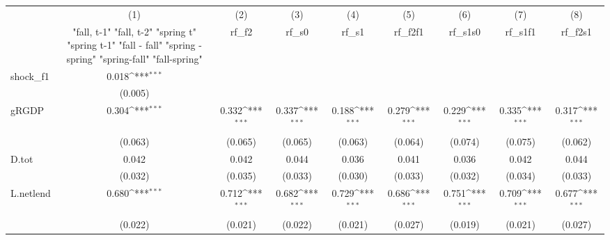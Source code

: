 {
\def\sym#1{\ifmmode^{#1}\else\(^{#1}\)\fi}
\begin{tabular}{l*{8}{c}}
\toprule
            &\multicolumn{1}{c}{(1)}&\multicolumn{1}{c}{(2)}&\multicolumn{1}{c}{(3)}&\multicolumn{1}{c}{(4)}&\multicolumn{1}{c}{(5)}&\multicolumn{1}{c}{(6)}&\multicolumn{1}{c}{(7)}&\multicolumn{1}{c}{(8)}\\
            &\multicolumn{1}{c}{  "fall, t-1" "fall, t-2" "spring t" "spring t-1"  "fall - fall" "spring - spring" "spring-fall" "fall-spring" }&\multicolumn{1}{c}{rf\_f2}&\multicolumn{1}{c}{rf\_s0}&\multicolumn{1}{c}{rf\_s1}&\multicolumn{1}{c}{rf\_f2f1}&\multicolumn{1}{c}{rf\_s1s0}&\multicolumn{1}{c}{rf\_s1f1}&\multicolumn{1}{c}{rf\_f2s1}\\
\midrule
shock\_f1    &       0.018\sym{***}&                     &                     &                     &                     &                     &                     &                     \\
            &     (0.005)         &                     &                     &                     &                     &                     &                     &                     \\
\addlinespace
gRGDP       &       0.304\sym{***}&       0.332\sym{***}&       0.337\sym{***}&       0.188\sym{***}&       0.279\sym{***}&       0.229\sym{***}&       0.335\sym{***}&       0.317\sym{***}\\
            &     (0.063)         &     (0.065)         &     (0.065)         &     (0.063)         &     (0.064)         &     (0.074)         &     (0.075)         &     (0.062)         \\
\addlinespace
D.tot       &       0.042         &       0.042         &       0.044         &       0.036         &       0.041         &       0.036         &       0.042         &       0.044         \\
            &     (0.032)         &     (0.035)         &     (0.033)         &     (0.030)         &     (0.033)         &     (0.032)         &     (0.034)         &     (0.033)         \\
\addlinespace
L.netlend   &       0.680\sym{***}&       0.712\sym{***}&       0.682\sym{***}&       0.729\sym{***}&       0.686\sym{***}&       0.751\sym{***}&       0.709\sym{***}&       0.677\sym{***}\\
            &     (0.022)         &     (0.021)         &     (0.022)         &     (0.021)         &     (0.027)         &     (0.019)         &     (0.021)         &     (0.027)         \\

\end{tabular}}
